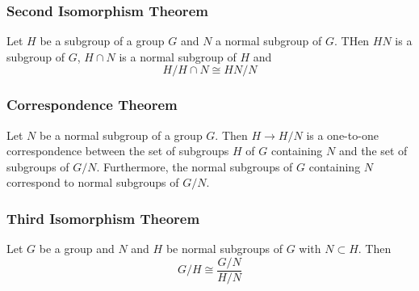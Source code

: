 \documentclass{article}
\begin{document}
\subsubsection{Second Isomorphism Theorem}
Let $H$ be a subgroup of a group $G$ and $N$ a normal subgroup of $G$. THen $HN$ is a subgroup of $G$, $H\cap N$ is a normal subgroup of $H$ and $$H/H\cap N\cong HN/N$$
\subsubsection{Correspondence Theorem}
Let $N$ be a normal subgroup of a group $G$. Then $H\longrightarrow H/N$ is a one-to-one correspondence between the set of subgroups $H$ of $G$ containing $N$ and the set of subgroups of $G/N$. Furthermore, the normal subgroups of $G$ containing $N$ correspond to normal subgroups of $G/N$.
\subsubsection{Third Isomorphism Theorem}
Let $G$ be a group and $N$ and $H$ be normal subgroups of $G$ with $N\subset H$. Then $$G/H\cong \frac{G/N}{H/N}$$
\end{document}
